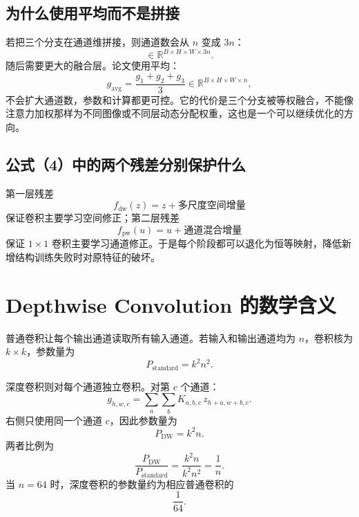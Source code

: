 \documentclass[UTF8,12pt,a4paper,fontset=none]{ctexart}
\newcommand{\R}{\mathbb{R}}
\begin{document}
\subsection{为什么使用平均而不是拼接}

若把三个分支在通道维拼接，则通道数会从 $n$ 变成 $3n$：
\begin{equation}
 [g_1;g_2;g_3]\in\R^{B\times H\times W\times3n}.
\end{equation}
随后需要更大的融合层。论文使用平均：
\begin{equation}
 g_{\mathrm{avg}}=\frac{g_1+g_2+g_3}{3}\in\R^{B\times H\times W\times n},
\end{equation}
不会扩大通道数，参数和计算都更可控。它的代价是三个分支被等权融合，不能像注意力加权那样为不同图像或不同层动态分配权重，这也是一个可以继续优化的方向。

\subsection{公式（4）中的两个残差分别保护什么}

第一层残差
\begin{equation}
 f_{\mathrm{dw}}(z)=z+\text{多尺度空间增量}
\end{equation}
保证卷积主要学习空间修正；第二层残差
\begin{equation}
 f_{\mathrm{pw}}(u)=u+\text{通道混合增量}
\end{equation}
保证 $1\times1$ 卷积主要学习通道修正。于是每个阶段都可以退化为恒等映射，降低新增结构训练失败时对原特征的破坏。

\section{Depthwise Convolution 的数学含义}

普通卷积让每个输出通道读取所有输入通道。若输入和输出通道均为 $n$，卷积核为 $k\times k$，参数量为
\begin{equation}
 P_{\mathrm{standard}}=k^2n^2.
\end{equation}

深度卷积则对每个通道独立卷积。对第 $c$ 个通道：
\begin{equation}
 g_{h,w,c}
 =\sum_a\sum_b
 K_{a,b,c}\,z_{h+a,w+b,c}.
\end{equation}
右侧只使用同一个通道 $c$，因此参数量为
\begin{equation}
 P_{\mathrm{DW}}=k^2n.
\end{equation}
两者比例为
\begin{equation}
 \frac{P_{\mathrm{DW}}}{P_{\mathrm{standard}}}
 =\frac{k^2n}{k^2n^2}
 =\frac{1}{n}.
\end{equation}
当 $n=64$ 时，深度卷积的参数量约为相应普通卷积的
\begin{equation}
 \frac{1}{64}.
\end{equation}
\end{document}
